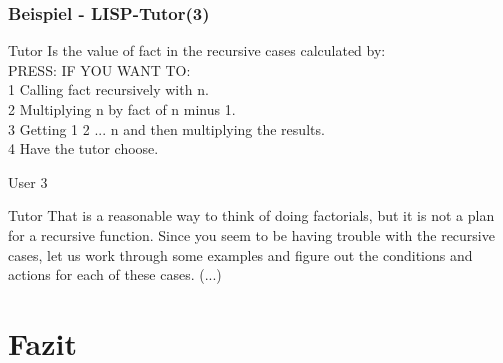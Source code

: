 \documentclass{beamer}
\begin{document}
\begin{frame}
  \frametitle{Beispiel - LISP-Tutor(3)}
  \begin{alertblock}{Tutor}
    Is the value of fact in the recursive cases calculated by:\\
    PRESS:      IF YOU WANT TO:\\
    1           Calling fact recursively with n.\\
    2           Multiplying n by fact of n minus 1.\\
    3           Getting 1 2 ... n and then multiplying the results.\\
    4           Have the tutor choose.\\
  \end{alertblock}

  \begin{block}{User}
    3
  \end{block}

  \begin{alertblock}{Tutor}
    That is a reasonable way to think of doing factorials, but it is not a plan for a recursive function.
    Since you seem to be having trouble with the recursive cases, let us work through some examples and
    figure out the conditions and actions for each of these cases.
    (...)
  \end{alertblock}

\end{frame}



\section{Fazit}
\end{document}
